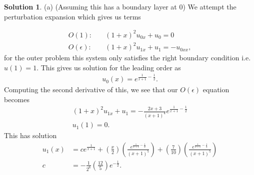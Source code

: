 \documentclass[12pt]{article}
\theoremstyle{definition}
\newtheorem{sol}{Solution}
\theoremstyle{remark}
\begin{document}
\begin{sol}

    (a) (Assuming this has a boundary layer at 0) We attempt the perturbation expansion which gives us terms

    \begin{align*}
        O(1): &\quad (1 + x)^{2} u_{0x} + u_{0} = 0\\
        O(\epsilon): &\quad (1 + x)^{2} u_{1x} + u_{1} = -u_{0xx},
    \end{align*}
    for the outer problem this system only satisfies the right boundary condition i.e. $u(1)=1$. This gives us solution for the leading order as
     \begin{align*}
         u_{0}(x) = e^{\frac{1}{x+1} - \frac{1}{2}}.
    \end{align*}
    Computing the second derivative of this, we see that our $O(\epsilon)$ equation becomes
    \begin{align*}
        (1 + x)^{2} u_{1x} + u_{1} = - \frac{2x + 3}{(x+1)^{4}} e^{\frac{1}{x+1} - \frac{1}{2}}\\
        u_{1}(1) = 0.
    \end{align*}
    This has solution
    \begin{align*}
        u_{1}(x) &= c e^{\frac{1}{x+1}} + \left(\frac{x}{2}\right) \left( \frac{ e^{\frac{1}{x+1} - \frac{1}{2}}}{(x+1)^{5}}\right) +  \left(\frac{7}{10}\right) \left( \frac{ e^{\frac{1}{x+1} - \frac{1}{2}}}{(x+1)^{5}}\right)\\
        c &= - \frac{1}{2^{6}} \left( \frac{12}{5}\right) e^{-\frac{1}{2}}.
    \end{align*}
    

\end{sol}
\end{document}
